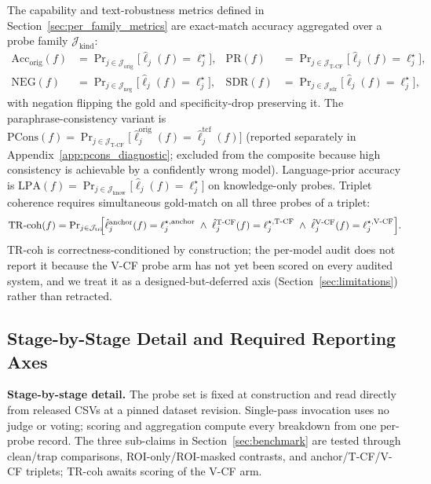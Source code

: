 \documentclass{article}
\begin{document}
The capability and text-robustness metrics defined in Section~\ref{sec:per_family_metrics} are exact-match accuracy aggregated over a probe family $\mathcal{J}_{\mathrm{kind}}$:
\begin{align}
  \mathrm{Acc}_{\mathrm{orig}}(f) &= \Pr\nolimits_{j\in\mathcal{J}_{\mathrm{orig}}}\!\!\bigl[\hat{\ell}_j(f)=\ell^{\star}_j\bigr], &
  \mathrm{PR}(f) &= \Pr\nolimits_{j\in\mathcal{J}_{\mathrm{T\text{-}CF}}}\!\!\bigl[\hat{\ell}_j(f)=\ell^{\star}_j\bigr], \nonumber\\
  \mathrm{NEG}(f) &= \Pr\nolimits_{j\in\mathcal{J}_{\mathrm{neg}}}\!\!\bigl[\hat{\ell}_j(f)=\ell^{\star}_j\bigr], &
  \mathrm{SDR}(f) &= \Pr\nolimits_{j\in\mathcal{J}_{\mathrm{sdr}}}\!\!\bigl[\hat{\ell}_j(f)=\ell^{\star}_j\bigr],
  \label{eq:cap_metrics}
\end{align}
with negation flipping the gold and specificity-drop preserving it. The paraphrase-consistency variant is $\mathrm{PCons}(f)=\Pr_{j\in\mathcal{J}_{\mathrm{T\text{-}CF}}}\!\bigl[\hat{\ell}^{\mathrm{orig}}_j(f)=\hat{\ell}^{\mathrm{tcf}}_j(f)\bigr]$ (reported separately in Appendix~\ref{app:pcons_diagnostic}; excluded from the composite because high consistency is achievable by a confidently wrong model). Language-prior accuracy is $\mathrm{LPA}(f)=\Pr_{j\in\mathcal{J}_{\mathrm{know}}}\!\bigl[\hat{\ell}_j(f)=\ell^{\star}_j\bigr]$ on knowledge-only probes. Triplet coherence requires simultaneous gold-match on all three probes of a triplet:
\begin{equation}
  \mathrm{TR\text{-}coh}(f) = \Pr\nolimits_{j\in\mathcal{J}_{\mathrm{tri}}}\!\!\Bigl[
    \hat{\ell}^{\mathrm{anchor}}_j(f)=\ell^{\star,\mathrm{anchor}}_j
    \;\wedge\;
    \hat{\ell}^{\mathrm{T\text{-}CF}}_j(f)=\ell^{\star,\mathrm{T\text{-}CF}}_j
    \;\wedge\;
    \hat{\ell}^{\mathrm{V\text{-}CF}}_j(f)=\ell^{\star,\mathrm{V\text{-}CF}}_j
  \Bigr].
  \label{eq:trcoh}
\end{equation}
TR-coh is correctness-conditioned by construction; the per-model audit does not report it because the V-CF probe arm has not yet been scored on every audited system, and we treat it as a designed-but-deferred axis (Section~\ref{sec:limitations}) rather than retracted.

\subsection{Stage-by-Stage Detail and Required Reporting Axes}

\textbf{Stage-by-stage detail.} The probe set is fixed at construction and read directly from released CSVs at a pinned dataset revision. Single-pass invocation uses no judge or voting; scoring and aggregation compute every breakdown from one per-probe record. The three sub-claims in Section~\ref{sec:benchmark} are tested through clean/trap comparisons, ROI-only/ROI-masked contrasts, and anchor/T-CF/V-CF triplets; TR-coh awaits scoring of the V-CF arm.
\end{document}
